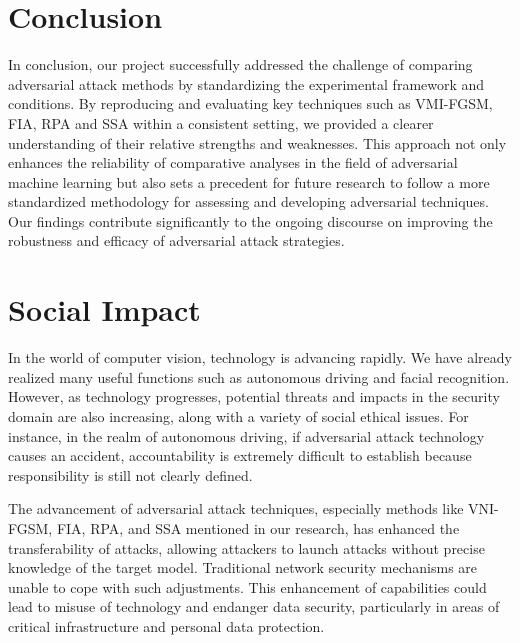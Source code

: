 \section{Conclusion}

In conclusion, our project successfully addressed the challenge of comparing adversarial attack methods by standardizing the experimental framework and conditions. By reproducing and evaluating key techniques such as VMI-FGSM, FIA, RPA and SSA within a consistent setting, we provided a clearer understanding of their relative strengths and weaknesses. This approach not only enhances the reliability of comparative analyses in the field of adversarial machine learning but also sets a precedent for future research to follow a more standardized methodology for assessing and developing adversarial techniques. Our findings contribute significantly to the ongoing discourse on improving the robustness and efficacy of adversarial attack strategies.

{\small


}


\newpage
\section*{Social Impact}
In the world of computer vision, technology is advancing rapidly. We have already realized many useful functions such as autonomous driving and facial recognition. However, as technology progresses, potential threats and impacts in the security domain are also increasing, along with a variety of social ethical issues. For instance, in the realm of autonomous driving, if adversarial attack technology causes an accident, accountability is extremely difficult to establish because responsibility is still not clearly defined.

The advancement of adversarial attack techniques, especially methods like VNI-FGSM, FIA, RPA, and SSA mentioned in our research, has enhanced the transferability of attacks, allowing attackers to launch attacks without precise knowledge of the target model. Traditional network security mechanisms are unable to cope with such adjustments. This enhancement of capabilities could lead to misuse of technology and endanger data security, particularly in areas of critical infrastructure and personal data protection.

